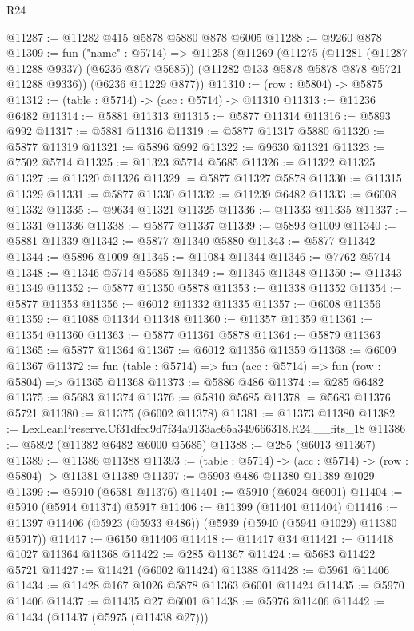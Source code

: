 \begin{lexlean}{R24}
\begin{coremodule}
@11287 := @11282 @415 @5878 @5880 @878 @6005
@11288 := @9260 @878
@11309 := fun ("name" : @5714) =>
  @11258
    (@11269
      (@11275
        (@11281 (@11287 @11288 @9337) (@6236 @877 @5685))
        (@11282 @133 @5878 @5878 @878 @5721 @11288 @9336))
      (@6236 @11229 @877))
@11310 := (row : @5804) -> @5875
@11312 := (table : @5714) -> (acc : @5714) -> @11310
@11313 := @11236 @6482
@11314 := @5881 @11313
@11315 := @5877 @11314
@11316 := @5893 @992
@11317 := @5881 @11316
@11319 := @5877 @11317 @5880
@11320 := @5877 @11319
@11321 := @5896 @992
@11322 := @9630 @11321
@11323 := @7502 @5714
@11325 := @11323 @5714 @5685
@11326 := @11322 @11325
@11327 := @11320 @11326
@11329 := @5877 @11327 @5878
@11330 := @11315 @11329
@11331 := @5877 @11330
@11332 := @11239 @6482
@11333 := @6008 @11332
@11335 := @9634 @11321 @11325
@11336 := @11333 @11335
@11337 := @11331 @11336
@11338 := @5877 @11337
@11339 := @5893 @1009
@11340 := @5881 @11339
@11342 := @5877 @11340 @5880
@11343 := @5877 @11342
@11344 := @5896 @1009
@11345 := @11084 @11344
@11346 := @7762 @5714
@11348 := @11346 @5714 @5685
@11349 := @11345 @11348
@11350 := @11343 @11349
@11352 := @5877 @11350 @5878
@11353 := @11338 @11352
@11354 := @5877 @11353
@11356 := @6012 @11332 @11335
@11357 := @6008 @11356
@11359 := @11088 @11344 @11348
@11360 := @11357 @11359
@11361 := @11354 @11360
@11363 := @5877 @11361 @5878
@11364 := @5879 @11363
@11365 := @5877 @11364
@11367 := @6012 @11356 @11359
@11368 := @6009 @11367
@11372 := fun (table : @5714) => fun (acc : @5714) => fun (row : @5804) => @11365 @11368
@11373 := @5886 @486
@11374 := @285 @6482
@11375 := @5683 @11374
@11376 := @5810 @5685
@11378 := @5683 @11376 @5721
@11380 := @11375 (@6002 @11378)
@11381 := @11373 @11380
@11382 := LexLeanPreserve.Cf31dfec9d7f34a9133ae65a349666318.R24.__fits_18
@11386 := @5892 (@11382 @6482 @6000 @5685)
@11388 := @285 (@6013 @11367)
@11389 := @11386 @11388
@11393 := (table : @5714) -> (acc : @5714) -> (row : @5804) -> @11381 @11389
@11397 := @5903 @486 @11380 @11389 @1029
@11399 := @5910 (@6581 @11376)
@11401 := @5910 (@6024 @6001)
@11404 := @5910 (@5914 @11374) @5917
@11406 := @11399 (@11401 @11404)
@11416 := @11397 @11406 (@5923 (@5933 @486)) (@5939 (@5940 (@5941 @1029) @11380 @5917))
@11417 := @6150 @11406
@11418 := @11417 @34
@11421 := @11418 @1027 @11364 @11368
@11422 := @285 @11367
@11424 := @5683 @11422 @5721
@11427 := @11421 (@6002 @11424) @11388
@11428 := @5961 @11406
@11434 := @11428 @167 @1026 @5878 @11363 @6001 @11424
@11435 := @5970 @11406
@11437 := @11435 @27 @6001
@11438 := @5976 @11406
@11442 := @11434 (@11437 (@5975 (@11438 @27)))

\end{coremodule}
\end{lexlean}
